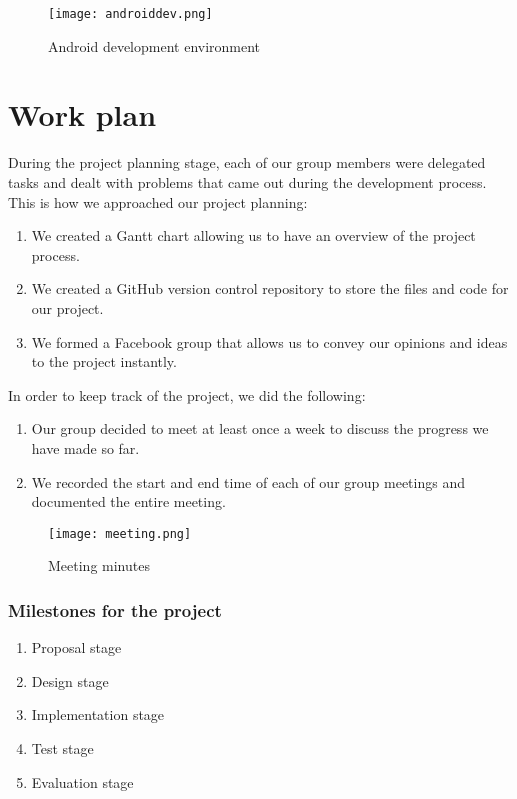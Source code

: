 \documentclass[10pt,a4paper,oneside]{report}
\begin{document}
\begin{figure}[H]
 \centering
 \texttt{[image: androiddev.png]}
 \caption{Android development environment}
\end{figure}

\section*{Work plan}
During the project planning stage, each of our group members were delegated tasks and dealt with problems that came out during the development process.
This is how we approached our project planning:
\begin{enumerate}
\item{We created a Gantt chart allowing us to have an overview of the project process.}
\item{We created a GitHub version control repository to store the files and code for our project.}
\item{We formed a Facebook group that allows us to convey our opinions and ideas to the project instantly.}
\end{enumerate}
In order to keep track of the project, we did the following:
\begin{enumerate}
\item{Our group decided to meet at least once a week to discuss the progress we have made so far.}
\item{We recorded the start and end time of each of our group meetings and documented the entire meeting.}
\end{enumerate}

\begin{figure}[H]
 \centering
 \texttt{[image: meeting.png]}
 \caption{Meeting minutes}
\end{figure}

\subsubsection*{Milestones for the project}
\begin{enumerate}
\item{Proposal stage}
\item{Design stage}
\item{Implementation stage}
\item{Test stage}
\item{Evaluation stage}
\end{enumerate}


\end{document}
